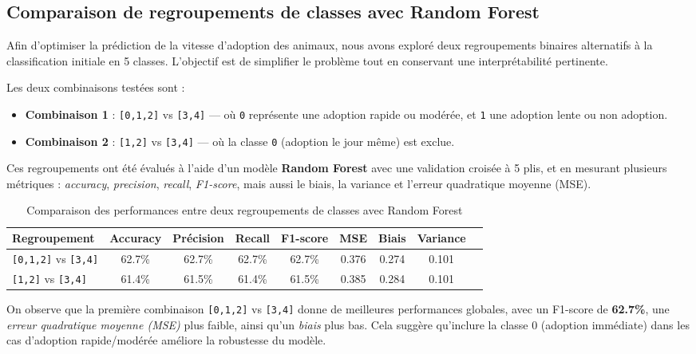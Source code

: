 \documentclass[a4paper,12pt]{article}
\begin{document}
\subsection{Comparaison de regroupements de classes avec Random Forest}

Afin d’optimiser la prédiction de la vitesse d’adoption des animaux, nous avons exploré deux regroupements binaires alternatifs à la classification initiale en 5 classes. L’objectif est de simplifier le problème tout en conservant une interprétabilité pertinente.

Les deux combinaisons testées sont :
\begin{itemize}
    \item \textbf{Combinaison 1} : \texttt{[0,1,2]} vs \texttt{[3,4]} — où \texttt{0} représente une adoption rapide ou modérée, et \texttt{1} une adoption lente ou non adoption.
    \item \textbf{Combinaison 2} : \texttt{[1,2]} vs \texttt{[3,4]} — où la classe \texttt{0} (adoption le jour même) est exclue.
\end{itemize}

Ces regroupements ont été évalués à l’aide d’un modèle \textbf{Random Forest} avec une validation croisée à 5 plis, et en mesurant plusieurs métriques : \textit{accuracy}, \textit{precision}, \textit{recall}, \textit{F1-score}, mais aussi le biais, la variance et l’erreur quadratique moyenne (MSE).

\vspace{0.3cm}
\begin{table}[h]
\centering
\begin{tabular}{|l|c|c|c|c|c|c|c|c|}
\hline
\textbf{Regroupement} & \textbf{Accuracy} & \textbf{Précision} & \textbf{Recall} & \textbf{F1-score} & \textbf{MSE} & \textbf{Biais} & \textbf{Variance} \\
\hline
\texttt{[0,1,2]} vs \texttt{[3,4]} & 62.7\% & 62.7\% & 62.7\% & 62.7\% & 0.376 & 0.274 & 0.101  \\
\texttt{[1,2]} vs \texttt{[3,4]}   & 61.4\% & 61.5\% & 61.4\% & 61.5\% & 0.385 & 0.284 & 0.101  \\
\hline
\end{tabular}
\caption{Comparaison des performances entre deux regroupements de classes avec Random Forest}
\end{table}

\noindent
On observe que la première combinaison \texttt{[0,1,2]} vs \texttt{[3,4]} donne de meilleures performances globales, avec un F1-score de \textbf{62.7\%}, une \textit{erreur quadratique moyenne (MSE)} plus faible, ainsi qu’un \textit{biais} plus bas. Cela suggère qu'inclure la classe 0 (adoption immédiate) dans les cas d’adoption rapide/modérée améliore la robustesse du modèle.
\end{document}
